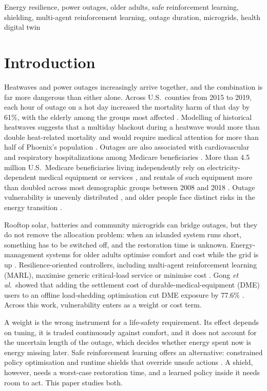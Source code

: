 \documentclass[conference]{IEEEtran}
\begin{document}
\begin{IEEEkeywords}
Energy resilience, power outages, older adults, safe reinforcement learning, shielding, multi-agent reinforcement learning, outage duration, microgrids, health digital twin
\end{IEEEkeywords}

\section{Introduction}
Heatwaves and power outages increasingly arrive together, and the combination is far more dangerous than either alone. Across U.S.\ counties from 2015 to 2019, each hour of outage on a hot day increased the mortality harm of that day by 61\%, with the elderly among the groups most affected \cite{ai2025heat}. Modelling of historical heatwaves suggests that a multiday blackout during a heatwave would more than double heat-related mortality and would require medical attention for more than half of Phoenix's population \cite{stone2023blackouts}. Outages are also associated with cardiovascular and respiratory hospitalizations among Medicare beneficiaries \cite{mcbrien2026outages}. More than 4.5 million U.S.\ Medicare beneficiaries living independently rely on electricity-dependent medical equipment or services \cite{empower}, and rentals of such equipment more than doubled across most demographic groups between 2008 and 2018 \cite{casey2021dme}. Outage vulnerability is unevenly distributed \cite{dugan2025survey,ezzati2025porsvi}, and older people face distinct risks in the energy transition \cite{zuk2024ageism}.

Rooftop solar, batteries and community microgrids can bridge outages, but they do not remove the allocation problem: when an islanded system runs short, something has to be switched off, and the restoration time is unknown. Energy-management systems for older adults optimise comfort and cost while the grid is up \cite{athanasiadis2022sems,tsaknakis2023nearly,kaculi2025human}. Resilience-oriented controllers, including multi-agent reinforcement learning (MARL), maximise generic critical-load service or minimise cost \cite{wu2026marl,qiu2023repair,esan2026lean}. Gong \textit{et al.}\ showed that adding the settlement cost of durable-medical-equipment (DME) users to an offline load-shedding optimisation cut DME exposure by 77.6\% \cite{gong2026dilemma}. Across this work, vulnerability enters as a weight or cost term.

A weight is the wrong instrument for a life-safety requirement. Its effect depends on tuning, it is traded continuously against comfort, and it does not account for the uncertain length of the outage, which decides whether energy spent now is energy missing later. Safe reinforcement learning offers an alternative: constrained policy optimisation \cite{achiam2017cpo,stooke2020pid,ray2019safety} and runtime shields that override unsafe actions \cite{alshiekh2018shield}. A shield, however, needs a worst-case restoration time, and a learned policy inside it needs room to act. This paper studies both.
\end{document}
